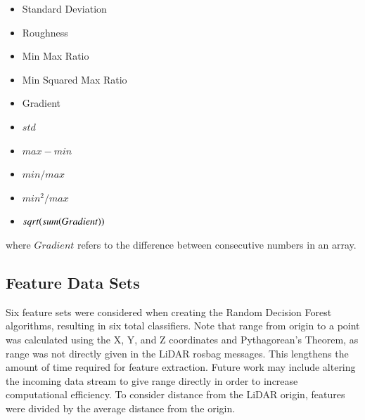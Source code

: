 \documentclass[numbered,pdftex]{ohio-etd}
\begin{document}
{{{{				\begin{multicols}{2}
					\begin{itemize}[itemsep=3pt]
						\item Standard Deviation
						\item Roughness
						\item Min Max Ratio
						\item Min Squared Max Ratio
						\item Gradient
					\end{itemize}
					\vfill\null
					\begin{itemize}[itemsep=3pt]
						\item $std$
						\item $max - min$
						\item $min / max$
						\item $min^2 / max$
						\item $sqrt(sum(Gradient\*))$
					\end{itemize}
					\vfill\null
					\label{lst:feature_list}
				\end{multicols}
			
				{where $Gradient$ refers to the difference between consecutive numbers in an array.}
			
			\newpage
				
			} %
		
			\subsection{Feature Data Sets}\label{sec:feature_data_sets} {
								
				{Six feature sets were considered when creating the Random Decision Forest algorithms, resulting in six total classifiers. Note that range from origin to a point was calculated using the X, Y, and Z coordinates and Pythagorean's Theorem, as range was not directly given in the LiDAR rosbag messages. This lengthens the amount of time required for feature extraction. Future work may include altering the incoming data stream to give range directly in order to increase computational efficiency. To consider distance from the LiDAR origin, features were divided by the average distance from the origin.}
				
}}}}
\end{document}
